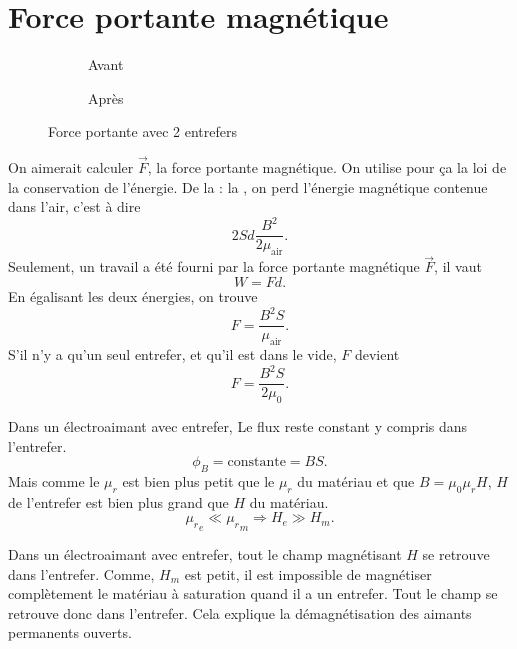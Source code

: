 \section{Force portante magnétique}
\begin{figure}[!ht]
  \begin{subfigure}{0.5\textwidth}
    \caption{Avant}
    \label{fig:before_portance}
  \end{subfigure}
  \begin{subfigure}{0.5\textwidth}
    \caption{Après}
    \label{fig:after_portance}
  \end{subfigure}
  \caption{Force portante avec 2 entrefers}
\end{figure}
On aimerait calculer $\vec F$, la force portante magnétique.
On utilise pour ça la loi de la conservation de l'énergie.
De la  : la ,
on perd l'énergie magnétique contenue dans l'air,
c'est à dire
\[ 2Sd\frac{B^2}{2\mu_\mathrm{air}}. \]
Seulement, un travail a été fourni par la force portante magnétique $\vec F$,
il vaut
\[ W = Fd. \]
En égalisant les deux énergies, on trouve
\[ F = \frac{B^2S}{\mu_\mathrm{air}}. \]
S'il n'y a qu'un seul entrefer, et qu'il est dans le vide, $F$ devient
\[ F = \frac{B^2S}{2\mu_0}. \]

Dans un électroaimant avec entrefer,
Le flux reste constant y compris dans l'entrefer.
\[ \phi_B = \text{constante} = BS. \]
Mais comme le $\mu_r$ est bien plus petit que le $\mu_r$ du matériau
et que $B = \mu_0\mu_r H$,
$H$ de l'entrefer est bien plus grand que $H$ du matériau.
\[ {\mu_r}_e \ll {\mu_r}_m \Rightarrow H_e \gg H_m. \]

Dans un électroaimant avec entrefer,
tout le champ magnétisant $H$ se retrouve dans l'entrefer.
Comme, $H_m$ est petit,
il est impossible de magnétiser complètement le
matériau à saturation quand il a un entrefer.
Tout le champ se retrouve donc dans l'entrefer.
Cela explique la démagnétisation des aimants permanents ouverts.


